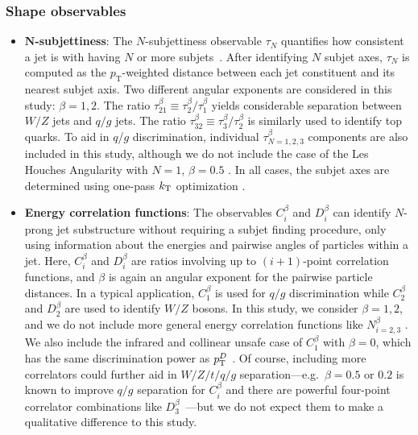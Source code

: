 \documentclass[11pt,letterpaper]{article}
\newcommand{\pt}{p_{\mathrm{T}}}
\begin{document}
\subsubsection{Shape observables}

\begin{itemize}
\item \textbf{$\mathbf{N}$-subjettiness}: The $N$-subjettiness observable $\tau_{N}$ quantifies how consistent a jet is with having $N$ or more subjets~\cite{Thaler:2010tr}.
%
After identifying $N$ subjet axes, $\tau_{N}$ is computed as the $\pt$-weighted distance between each jet constituent and its nearest subjet axis. 
%
Two different angular exponents are considered in this study: $\beta=1, 2$.
%
The ratio $\tau_{\mathrm{21}}^{\beta} \equiv \tau_{\mathrm{2}}^{\beta}/\tau_{\mathrm{1}}^{\beta}$ yields considerable separation between $W/Z$ jets and $q/g$ jets.
%
The ratio $\tau_{\mathrm{32}}^{\beta} \equiv \tau_{\mathrm{3}}^{\beta}/\tau_{\mathrm{2}}^{\beta}$ is similarly used to identify top quarks.
%
To aid in $q$/$g$ discrimination, individual $\tau_{N = 1,2,3}^{\beta}$ components are also included in this study, although we do not include the case of the Les Houches Angularity with $N = 1$, $\beta = 0.5$ \cite{Gras:2017jty}.
%
In all cases, the subjet axes are determined using one-pass $k_{\rm {T}}$ optimization \cite{Thaler:2011gf}.

\item \textbf{Energy correlation functions}:  The observables $C_{i}^{\beta}$ \cite{Larkoski:2013eya} and $D_{i}^{\beta}$ \cite{Larkoski:2015kga} can identify $N$-prong jet substructure without requiring a subjet finding procedure, only using information about the energies and pairwise angles of particles within a jet.  Here, $C_{i}^{\beta}$ and $D_{i}^{\beta}$ are ratios involving up to $(i+1)$-point correlation functions, and $\beta$ is again an angular exponent for the pairwise particle distances.  In a typical application, $C^{\beta}_{1}$ is used for $q/g$ discrimination while $C^{\beta}_{2}$ and $D^{\beta}_{2}$ are used to identify $W/Z$ bosons.  In this study, we consider $\beta=1, 2$, and we do not include more general energy correlation functions like $N_{i=2,3}^{\beta}$ \cite{Moult:2016cvt}.  We also include the infrared and collinear unsafe case of $C^{\beta}_{1}$ with $\beta = 0$, which has the same discrimination power as $p^D_{\rm{T}}$ \cite{Pandolfi:1480598,Chatrchyan:2012sn}.  Of course, including more correlators could further aid in $W/Z/t/q/g$ separation---e.g.\ $\beta=0.5$ or $0.2$ is known to improve $q/g$ separation for $C_{i}^{\beta}$ \cite{Larkoski:2013eya} and there are powerful four-point correlator combinations like $D_{3}^{\beta}$~\cite{Larkoski:2014zma}---but we do not expect them to make a qualitative difference to this study.


\end{itemize}
\end{document}
